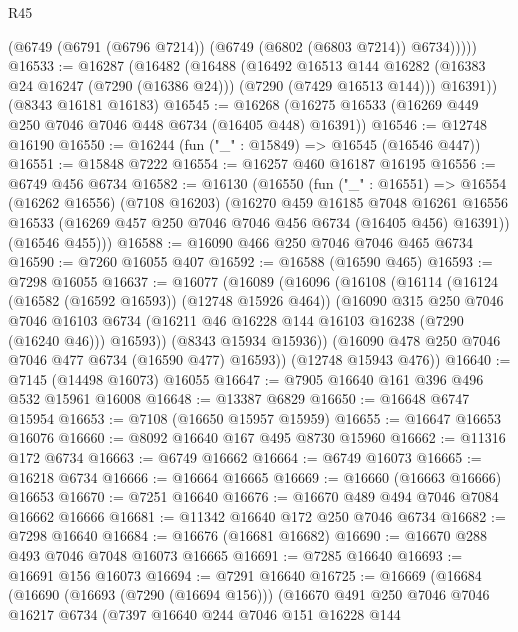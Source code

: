 \begin{lexlean}{R45}
\begin{coremodule}
{          (@6749 (@6791 (@6796 @7214)) (@6749 (@6802 (@6803 @7214)) @6734)))))
@16533 := @16287
    (@16482
      (@16488
        (@16492
          @16513
          @144
          @16282
          (@16383 @24 @16247 (@7290 (@16386 @24)))
          (@7290 (@7429 @16513 @144)))
        @16391))
    (@8343 @16181 @16183)
@16545 := @16268 (@16275 @16533 (@16269 @449 @250 @7046 @7046 @448 @6734 (@16405 @448) @16391))
@16546 := @12748 @16190
@16550 := @16244 (fun ("_" : @15849) => @16545 (@16546 @447))
@16551 := @15848 @7222
@16554 := @16257 @460 @16187 @16195
@16556 := @6749 @456 @6734
@16582 := @16130
    (@16550
      (fun ("_" : @16551) =>
      @16554
        (@16262 @16556)
        (@7108 @16203)
        (@16270
          @459
          @16185
          @7048
          @16261
          @16556
          @16533
          (@16269 @457 @250 @7046 @7046 @456 @6734 (@16405 @456) @16391))
        (@16546 @455)))
@16588 := @16090 @466 @250 @7046 @7046 @465 @6734
@16590 := @7260 @16055 @407
@16592 := @16588 (@16590 @465)
@16593 := @7298 @16055
@16637 := @16077
    (@16089
      (@16096
        (@16108
          (@16114
            (@16124 (@16582 (@16592 @16593)) (@12748 @15926 @464))
            (@16090
              @315
              @250
              @7046
              @7046
              @16103
              @6734
              (@16211 @46 @16228 @144 @16103 @16238 (@7290 (@16240 @46)))
              @16593))
          (@8343 @15934 @15936))
        (@16090 @478 @250 @7046 @7046 @477 @6734 (@16590 @477) @16593))
      (@12748 @15943 @476))
@16640 := @7145 (@14498 @16073) @16055
@16647 := @7905 @16640 @161 @396 @496 @532 @15961 @16008
@16648 := @13387 @6829
@16650 := @16648 @6747 @15954
@16653 := @7108 (@16650 @15957 @15959)
@16655 := @16647 @16653 @16076
@16660 := @8092 @16640 @167 @495 @8730 @15960
@16662 := @11316 @172 @6734
@16663 := @6749 @16662
@16664 := @6749 @16073
@16665 := @16218 @6734
@16666 := @16664 @16665
@16669 := @16660 (@16663 @16666) @16653
@16670 := @7251 @16640
@16676 := @16670 @489 @494 @7046 @7084 @16662 @16666
@16681 := @11342 @16640 @172 @250 @7046 @6734
@16682 := @7298 @16640
@16684 := @16676 (@16681 @16682)
@16690 := @16670 @288 @493 @7046 @7048 @16073 @16665
@16691 := @7285 @16640
@16693 := @16691 @156 @16073
@16694 := @7291 @16640
@16725 := @16669
    (@16684
      (@16690
        (@16693 (@7290 (@16694 @156)))
        (@16670
          @491
          @250
          @7046
          @7046
          @16217
          @6734
          (@7397
            @16640
            @244
            @7046
            @151
            @16228
            @144
}
\end{coremodule}
\end{lexlean}
